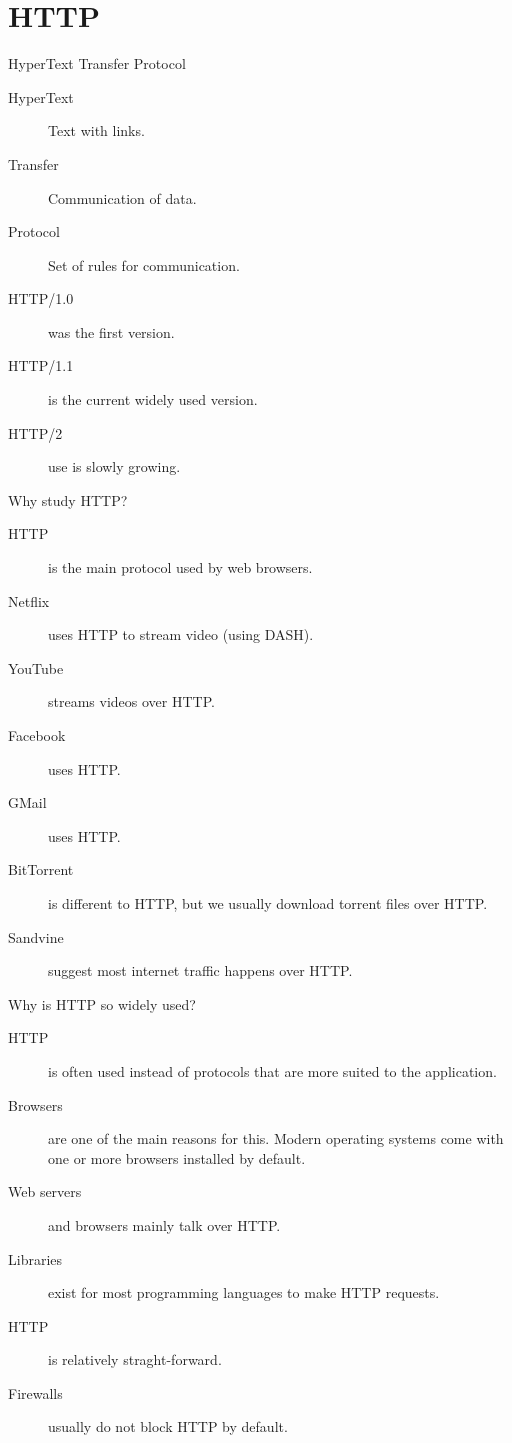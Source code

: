 \section{HTTP}


\begin{frame}{HyperText Transfer Protocol}
  \begin{description}
		\item[HyperText] Text with links.
		\item[Transfer] Communication of data.
		\item[Protocol] Set of rules for communication.\\[1cm]
    \item[HTTP/1.0] was the first version.
    \item[HTTP/1.1] is the current widely used version.
    \item[HTTP/2] use is slowly growing.
  \end{description}
\end{frame}


\begin{frame}{Why study HTTP?}
  \begin{description}
		\item[HTTP] is the main protocol used by web browsers.
    \item[Netflix] uses HTTP to stream video (using DASH).
    \item[YouTube] streams videos over HTTP.
    \item[Facebook] uses HTTP.
    \item[GMail] uses HTTP.
    \item[BitTorrent] is different to HTTP, but we usually download torrent files over HTTP.
    \item[Sandvine] suggest most internet traffic happens over HTTP.  
  \end{description}
\end{frame}


\begin{frame}{Why is HTTP so widely used?}
  \begin{description}
		\item[HTTP] is often used instead of protocols that are more suited to the application.
    \item[Browsers] are one of the main reasons for this. Modern operating systems come with one or more browsers installed by default.
    \item[Web servers] and browsers mainly talk over HTTP.
    \item[Libraries] exist for most programming languages to make HTTP requests.
    \item[HTTP] is relatively straght-forward.
    \item[Firewalls] usually do not block HTTP by default.  
  \end{description}
\end{frame}


